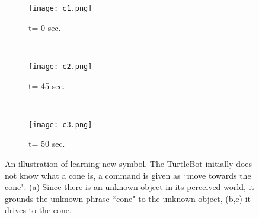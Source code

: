 

\begin{figure}[htb!]
\begin{subfigure}[b]{0.305\columnwidth}
\centering
\texttt{[image: c1.png]}
\caption{t= 0 sec.}
\label{fig:exp_new_1}
\end{subfigure}
~
\begin{subfigure}[b]{0.31\columnwidth}
\centering
\texttt{[image: c2.png]}
\caption{t= 45 sec.}
\label{fig:exp_new_2}
\end{subfigure}
~
\begin{subfigure}[b]{0.315\columnwidth}
\centering
\texttt{[image: c3.png]}
\caption{t= 50 sec.}
\label{fig:exp_new_3}
\end{subfigure}
\caption{An illustration of learning new symbol. The TurtleBot initially does not know what a cone is, a command is given as ``move towards the cone". (a) Since there is an unknown object in its perceived world, it grounds the unknown phrase ``cone" to the unknown object, (b,c) it drives to the cone.}
\label{fig:cone}
\end{figure}




